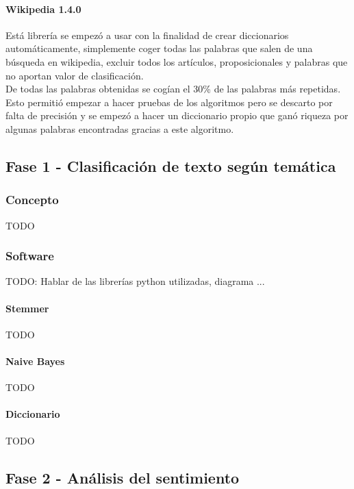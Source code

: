 \documentclass[../all.tex]{subfiles}
\begin{document}
        \paragraph{Wikipedia 1.4.0}
            Está librería se empezó a usar con la finalidad de crear diccionarios automáticamente, simplemente coger todas las palabras que salen de una búsqueda en wikipedia, excluir todos los artículos, proposicionales y palabras que no aportan valor de clasificación.\\
            
            De todas las palabras obtenidas se cogían el 30\% de las palabras más repetidas. Esto permitió empezar a hacer pruebas de los algoritmos pero se descarto por falta de precisión y se empezó a hacer un diccionario propio que ganó riqueza por algunas palabras encontradas gracias a este algoritmo.
            

\newpage    
\subsection{Fase 1 - Clasificación de texto según temática}
    \subsubsection{Concepto}
        {\color{red} 
            TODO
        }
    \subsubsection{Software}
        {\color{red} 
        TODO: Hablar de las librerías python utilizadas, diagrama ...
        }
        \paragraph{Stemmer}
            {\color{red} 
                TODO
            }
        \paragraph{Naive Bayes}
            {\color{red} 
                TODO
            }
        \paragraph{Diccionario}
            {\color{red} 
                TODO
            }

\newpage
\subsection{Fase 2 - Análisis del sentimiento}
\end{document}
